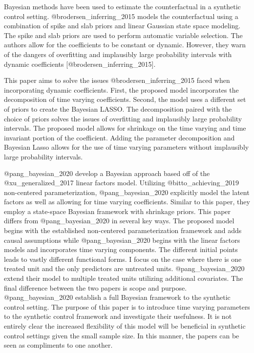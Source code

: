 \documentclass[
]{article}
\begin{document}
Bayesian methods have been used to estimate the counterfactual in a
synthetic control setting. @brodersen\_inferring\_2015 models the
counterfactual using a combination of spike and slab priors and linear
Gaussian state space modeling. The spike and slab priors are used to
perform automatic variable selection. The authors allow for the
coefficients to be constant or dynamic. However, they warn of the
dangers of overfitting and implausibly large probability intervals with
dynamic coefficients {[}@brodersen\_inferring\_2015{]}.

This paper aims to solve the issues @brodersen\_inferring\_2015 faced
when incorporating dynamic coefficients. First, the proposed model
incorporates the decomposition of time varying coefficients. Second, the
model uses a different set of priors to create the Bayesian LASSO. The
decomposition paired with the choice of priors solves the issues of
overfitting and implausibly large probability intervals. The proposed
model allows for shrinkage on the time varying and time invariant
portion of the coefficient. Adding the parameter decomposition and
Bayesian Lasso allows for the use of time varying parameters without
implausibly large probability intervals.

@pang\_bayesian\_2020 develop a Bayesian approach based off of the
@xu\_generalized\_2017 linear factors model. Utilizing
@bitto\_achieving\_2019 non-centered parameterization,
@pang\_bayesian\_2020 explicitly model the latent factors as well as
allowing for time varying coefficients. Similar to this paper, they
employ a state-space Bayesian framework with shrinkage priors. This
paper differs from @pang\_bayesian\_2020 in several key ways. The
proposed model begins with the established non-centered parameterization
framework and adds causal assumptions while @pang\_bayesian\_2020 begins
with the linear factors models and incorporates time varying components.
The different initial points leads to vastly different functional forms.
I focus on the case where there is one treated unit and the only
predictors are untreated units. @pang\_bayesian\_2020 extend their model
to multiple treated units utilizing additional covariates. The final
difference between the two papers is scope and purpose.
@pang\_bayesian\_2020 establish a full Bayesian framework to the
synthetic control setting. The purpose of this paper is to introduce
time varying parameters to the synthetic control framework and
investigate their usefulness. It is not entirely clear the increased
flexibility of this model will be beneficial in synthetic control
settings given the small sample size. In this manner, the papers can be
seen as compliments to one another.
\end{document}
